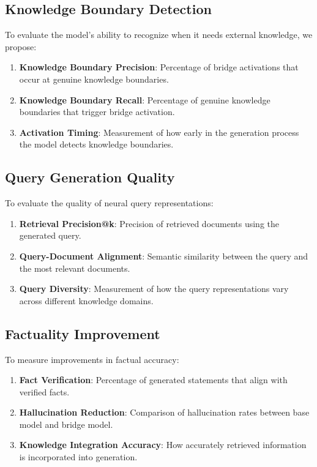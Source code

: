 \documentclass[9pt,a4paper,twocolumn,twoside]{tau-class/tau}
\begin{document}
\subsection{Knowledge Boundary Detection}

    To evaluate the model's ability to recognize when it needs external knowledge, we propose:

    \begin{enumerate}
        \item \textbf{Knowledge Boundary Precision}: Percentage of bridge activations that occur at genuine knowledge boundaries.
        \item \textbf{Knowledge Boundary Recall}: Percentage of genuine knowledge boundaries that trigger bridge activation.
        \item \textbf{Activation Timing}: Measurement of how early in the generation process the model detects knowledge boundaries.
    \end{enumerate}

\subsection{Query Generation Quality}

    To evaluate the quality of neural query representations:

    \begin{enumerate}
        \item \textbf{Retrieval Precision@k}: Precision of retrieved documents using the generated query.
        \item \textbf{Query-Document Alignment}: Semantic similarity between the query and the most relevant documents.
        \item \textbf{Query Diversity}: Measurement of how the query representations vary across different knowledge domains.
    \end{enumerate}

\subsection{Factuality Improvement}

    To measure improvements in factual accuracy:

    \begin{enumerate}
        \item \textbf{Fact Verification}: Percentage of generated statements that align with verified facts.
        \item \textbf{Hallucination Reduction}: Comparison of hallucination rates between base model and bridge model.
        \item \textbf{Knowledge Integration Accuracy}: How accurately retrieved information is incorporated into generation.
    \end{enumerate}
\end{document}

